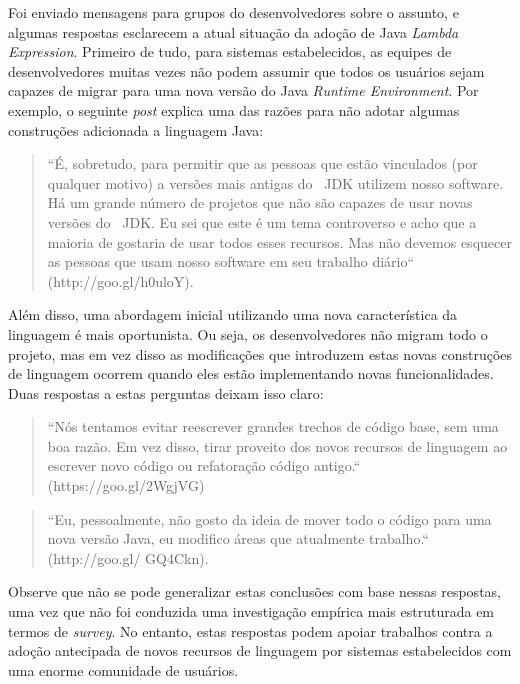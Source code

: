 Foi enviado mensagens para grupos do desenvolvedores sobre o assunto, e algumas respostas esclarecem a atual situação da adoção de Java\textit{ Lambda Expression}. Primeiro de tudo, para sistemas estabelecidos, as equipes de desenvolvedores muitas vezes não podem assumir que todos os usuários sejam capazes de migrar para uma nova versão do Java\textit{ Runtime Environment}. Por exemplo, o seguinte \textit{post} explica uma das razões para não adotar algumas construções adicionada a linguagem Java: 

\begin{quotation}
``É, sobretudo, para permitir que as pessoas que estão vinculados (por qualquer motivo) a versões mais antigas do ~\acs{JDK} utilizem nosso software. Há um grande número de projetos que não são capazes de usar novas versões do ~\acs{JDK}. Eu sei que este é um tema controverso e acho que a maioria de gostaria de usar todos esses recursos. Mas não devemos esquecer as pessoas que usam 
nosso software em seu trabalho diário`` (http://goo.gl/h0uloY).
\end{quotation}

Além disso, uma abordagem inicial utilizando uma nova característica da linguagem é mais oportunista. Ou seja, os desenvolvedores não migram todo o projeto, mas em vez disso as modificações que introduzem estas novas construções de linguagem ocorrem quando eles estão implementando novas funcionalidades. Duas respostas a estas perguntas deixam isso claro: 

\begin{quotation}
``Nós tentamos evitar reescrever grandes trechos de código base, sem uma boa razão. Em vez disso, tirar proveito dos novos recursos de linguagem ao escrever novo código ou refatoração código antigo.`` (https://goo.gl/2WgjVG) 
\end{quotation}

\begin{quotation}
 ``Eu, pessoalmente, não gosto da ideia de mover todo o código para uma nova versão Java, eu modifico áreas que atualmente trabalho.``  (http://goo.gl/ GQ4Ckn).
\end{quotation}

 Observe que não se pode generalizar estas conclusões com base nessas respostas, uma vez que não foi 
conduzida uma investigação empírica mais estruturada em termos de 
\emph{survey}. No entanto, estas respostas podem apoiar trabalhos contra a adoção antecipada de novos recursos de linguagem por sistemas estabelecidos com uma enorme comunidade de usuários.

